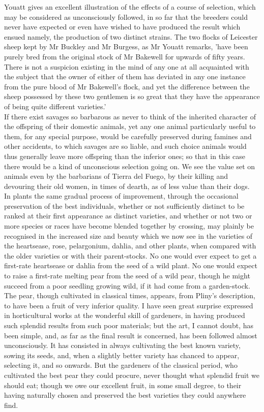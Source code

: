 \indent Youatt gives an excellent illustration of the effects of a course of selection, which may be considered as unconsciously followed, in so far that the breeders could never have expected or even have wished to have produced the result which ensued namely, the production of two distinct strains. The two flocks of Leicester sheep kept by Mr Buckley and Mr Burgess, as Mr Youatt remarks, 'have been purely bred from the original stock of Mr Bakewell for upwards of fifty years.  There is not a suspicion existing in the mind of any one at all acquainted with the subject that the owner of either of them has deviated in any one instance from the pure blood of Mr Bakewell's flock, and yet the difference between the sheep possessed by these two gentlemen is so great that they have the appearance of being quite different varieties.'  \\
\indent If there exist savages so barbarous as never to think of the inherited character of the offspring of their domestic animals, yet any one animal particularly useful to them, for any special purpose, would be carefully preserved during famines and other accidents, to which savages are so liable, and such choice animals would thus generally leave more offspring than the inferior ones; so that in this case there would be a kind of unconscious selection going on. We see the value set on animals even by the barbarians of Tierra del Fuego, by their killing and devouring their old women, in times of dearth, as of less value than their dogs.  \\
\indent In plants the same gradual process of improvement, through the occasional preservation of the best individuals, whether or not sufficiently distinct to be ranked at their first appearance as distinct varieties, and whether or not two or more species or races have become blended together by crossing, may plainly be recognised in the increased size and beauty which we now see in the varieties of the heartsease, rose, pelargonium, dahlia, and other plants, when compared with the older varieties or with their parent-stocks. No one would ever expect to get a first-rate heartsease or dahlia from the seed of a wild plant. No one would expect to raise a first-rate melting pear from the seed of a wild pear, though he might succeed from a poor seedling growing wild, if it had come from a garden-stock. The pear, though cultivated in classical times, appears, from Pliny's description, to have been a fruit of very inferior quality. I have seen great surprise expressed in horticultural works at the wonderful skill of gardeners, in having produced such splendid results from such poor materials; but the art, I cannot doubt, has been simple, and, as far as the final result is concerned, has been followed almost unconsciously. It has consisted in always cultivating the best known variety, sowing its seeds, and, when a slightly better variety has chanced to appear, selecting it, and so onwards. But the gardeners of the classical period, who cultivated the best pear they could procure, never thought what splendid fruit we should eat; though we owe our excellent fruit, in some small degree, to their having naturally chosen and preserved the best varieties they could anywhere find.  \\
